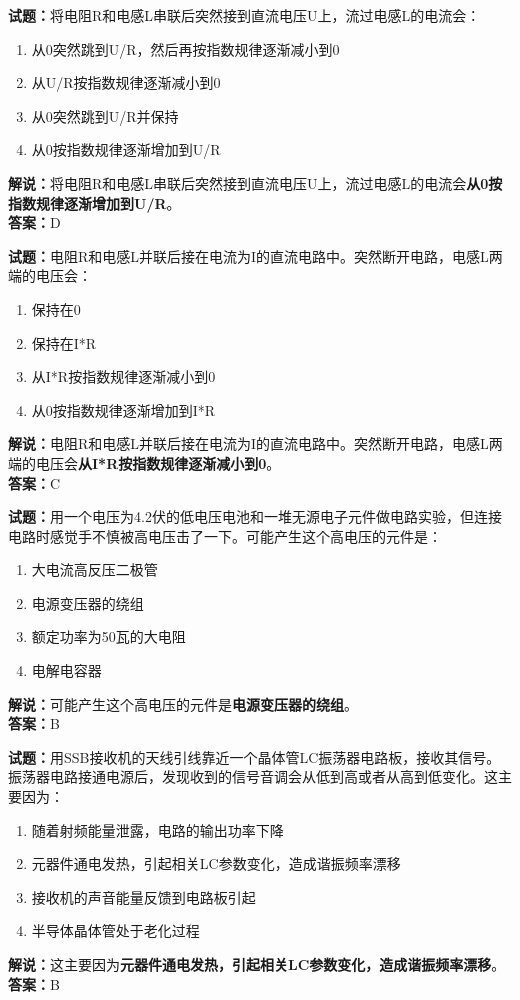 \documentclass{ctexbook}
\begin{document}
\textbf{试题：}将电阻R和电感L串联后突然接到直流电压U上，流过电感L的电流会：
\begin{enumerate}[leftmargin=3em]
  \item 从0突然跳到U/R，然后再按指数规律逐渐减小到0
  \item 从U/R按指数规律逐渐减小到0
  \item 从0突然跳到U/R并保持
  \item 从0按指数规律逐渐增加到U/R
\end{enumerate}
\noindent\textbf{解说：}将电阻R和电感L串联后突然接到直流电压U上，流过电感L的电流会\textbf{从0按指数规律逐渐增加到U/R}。\\\noindent\textbf{答案：}D

\vspace{1em}

\textbf{试题：}电阻R和电感L并联后接在电流为I的直流电路中。突然断开电路，电感L两端的电压会：
\begin{enumerate}[leftmargin=3em]
  \item 保持在0
  \item 保持在I*R
  \item 从I*R按指数规律逐渐减小到0
  \item 从0按指数规律逐渐增加到I*R
\end{enumerate}
\noindent\textbf{解说：}电阻R和电感L并联后接在电流为I的直流电路中。突然断开电路，电感L两端的电压会\textbf{从I*R按指数规律逐渐减小到0}。\\\noindent\textbf{答案：}C

\vspace{1em}

\textbf{试题：}用一个电压为4.2伏的低电压电池和一堆无源电子元件做电路实验，但连接电路时感觉手不慎被高电压击了一下。可能产生这个高电压的元件是：
\begin{enumerate}[leftmargin=3em]
  \item 大电流高反压二极管
  \item 电源变压器的绕组
  \item 额定功率为50瓦的大电阻
  \item 电解电容器
\end{enumerate}
\noindent\textbf{解说：}可能产生这个高电压的元件是\textbf{电源变压器的绕组}。\\\noindent\textbf{答案：}B

\vspace{1em}

\textbf{试题：}用SSB接收机的天线引线靠近一个晶体管LC振荡器电路板，接收其信号。振荡器电路接通电源后，发现收到的信号音调会从低到高或者从高到低变化。这主要因为：
\begin{enumerate}[leftmargin=3em]
  \item 随着射频能量泄露，电路的输出功率下降
  \item 元器件通电发热，引起相关LC参数变化，造成谐振频率漂移
  \item 接收机的声音能量反馈到电路板引起
  \item 半导体晶体管处于老化过程
\end{enumerate}
\noindent\textbf{解说：}这主要因为\textbf{元器件通电发热，引起相关LC参数变化，造成谐振频率漂移}。\\\noindent\textbf{答案：}B
\end{document}
